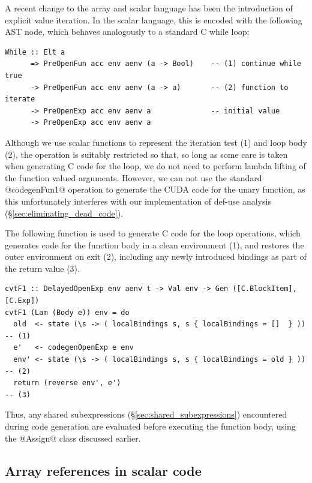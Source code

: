 A recent change to the array and scalar language has been the introduction of
explicit value iteration. In the scalar language, this is encoded with the
following AST node, which behaves analogously to a standard C while loop:
%
\begin{lstlisting}[style=haskell]
While :: Elt a
      => PreOpenFun acc env aenv (a -> Bool)    -- (1) continue while true
      -> PreOpenFun acc env aenv (a -> a)       -- (2) function to iterate
      -> PreOpenExp acc env aenv a              -- initial value
      -> PreOpenExp acc env aenv a
\end{lstlisting}
%
Although we use scalar functions to represent the iteration test (1) and loop
body (2), the operation is suitably restricted so that, so long as some care is
taken when generating C code for the loop, we do not need to perform lambda
lifting of the function valued arguments. However, we can not use the standard
@codegenFun1@ operation to generate the CUDA code for the unary function,
as this unfortunately interferes with our implementation of def-use analysis
(\S\ref{sec:eliminating_dead_code}).

The following function is used to generate C code for the loop operations, which
generates code for the function body in a clean environment (1), and restores
the outer environment on exit (2), including any newly introduced bindings as
part of the return value (3).
%
\begin{lstlisting}[style=haskell]
cvtF1 :: DelayedOpenExp env aenv t -> Val env -> Gen ([C.BlockItem], [C.Exp])
cvtF1 (Lam (Body e)) env = do
  old  <- state (\s -> ( localBindings s, s { localBindings = []  } ))              -- (1)
  e'   <- codegenOpenExp e env
  env' <- state (\s -> ( localBindings s, s { localBindings = old } ))              -- (2)
  return (reverse env', e')                                                         -- (3)
\end{lstlisting}
%
Thus, any shared subexpressions (\S\ref{sec:shared_subexpressions}) encountered
during code generation are evaluated before executing the function body, using
the @Assign@ class discussed earlier.


\subsection{Array references in scalar code}

